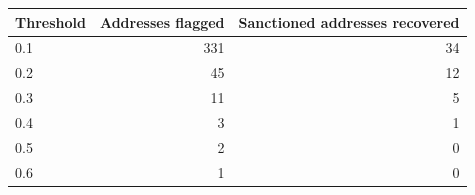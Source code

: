 \begin{tabular}{lrr}
\toprule
\textbf{Threshold} & \textbf{Addresses flagged} & \textbf{Sanctioned addresses recovered} \\
\midrule
0.1 & 331 & 34 \\
0.2 & 45 & 12 \\
0.3 & 11 & 5 \\
0.4 & 3 & 1 \\
0.5 & 2 & 0 \\
0.6 & 1 & 0 \\
\bottomrule
\end{tabular}
